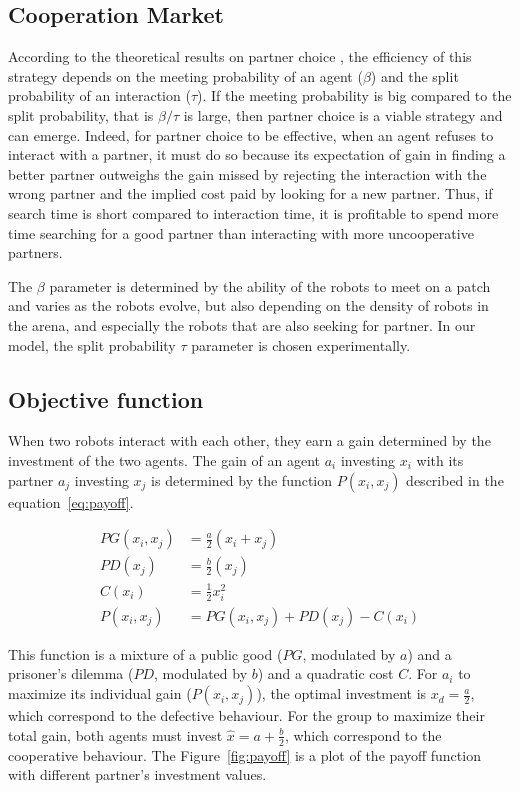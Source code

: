 \documentclass[letterpaper]{article}
\begin{document}
\subsection{Cooperation Market} \label{sec:market}
According to the theoretical results on partner choice \citep{Debove2015b}, the efficiency of this strategy depends on the meeting probability of an agent ($\beta$) and the split probability of an interaction ($\tau$). If the meeting probability is big compared to the split probability, that is $\beta/\tau$ is large, then partner choice is a viable strategy and can emerge. Indeed, for partner choice to be effective, when an agent refuses to interact with a partner, it must do so because its expectation of gain in finding a better partner outweighs the gain missed by rejecting the interaction with the wrong partner and the implied cost paid by looking for a new partner. Thus, if search time is short compared to interaction time, it is profitable to spend more time searching for a good partner than interacting with more uncooperative partners.

The $\beta$ parameter is determined by the ability of the robots to meet on a patch and varies as the robots evolve, but also depending on the density of robots in the arena, and especially the robots that are also seeking for partner. In our model, the split probability $\tau$ parameter is chosen experimentally.

\subsection{Objective function}

When two robots interact with each other, they earn a gain determined by the investment of the two agents. The gain of an agent $a_i$ investing $x_i$ with its partner $a_j$ investing $x_j$ is determined by the function $P(x_i, x_j)$ described in the equation~\ref{eq:payoff}.

\begin{align}
PG(x_i, x_j) &= \frac{a}{2} (x_i + x_j) \\
PD(x_j) &= \frac{b}{2} (x_j) \\
C(x_i) &= \frac{1}{2} x_i^2 \\
P(x_i, x_j)& = PG(x_i, x_j) + PD(x_j) - C(x_i) \label{eq:payoff}
\end{align}

This function is a mixture of a public good ($PG$, modulated by $a$) and a prisoner's dilemma ($PD$, modulated by $b$) and a quadratic cost $C$. For $a_i$ to maximize its individual gain ($P(x_i, x_j)$), the optimal investment is $x_d = \frac{a}{2}$, which correspond to the defective behaviour. For the group to maximize their total gain, both agents must invest $\hat{x} = a + \frac{b}{2}$, which correspond to the cooperative behaviour. The Figure~\ref{fig:payoff} is a plot of the payoff function with different partner's investment values.
\end{document}
